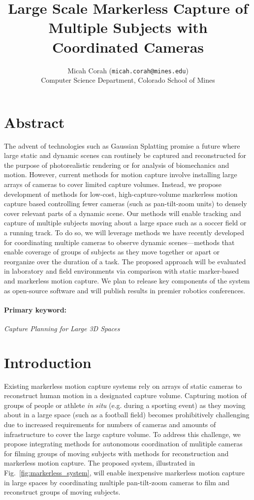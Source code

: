 \documentclass[11pt]{article}
\title{Large Scale Markerless Capture of Multiple Subjects
with Coordinated Cameras}
\author{Micah Corah (\texttt{micah.corah@mines.edu})
  \\
  Computer Science Department,
  Colorado School of Mines
}
\date{}
\begin{document}
\maketitle

\section{Abstract}


The advent of technologies such as Gaussian Splatting promise a future where
large static and dynamic scenes can routinely be captured and reconstructed for
the purpose of photorealistic rendering or for analysis of biomechanics and
motion.
However, current methods for motion capture involve installing large
arrays of cameras to cover limited capture volumes.
Instead, we propose development of methods for low-cost, high-capture-volume
markerless motion capture based controlling fewer cameras
(such as pan-tilt-zoom units) to densely cover relevant parts of a dynamic
scene.
Our methods will enable tracking and capture of multiple subjects moving about a
large space such as a soccer field or a running track.
To do so, we will leverage methods we have recently developed for coordinating
multiple cameras to observe dynamic scenes---methods that enable coverage of
groups of subjects as they move together or apart or reorganize over the
duration of a task.
The proposed approach will be evaluated in laboratory and field environments via
comparison with static marker-based and markerless motion capture.
We plan to release key components of the system as open-source software and will
publish results in premier robotics conferences.

\paragraph{Primary keyword:}
\emph{Capture Planning for Large 3D Spaces}

\section{Introduction}

Existing markerless motion capture systems rely on arrays of static cameras
to reconstruct human motion in a designated capture volume.
Capturing motion of groups of people or athlete \emph{in situ} (e.g. during a
sporting event) as they moving about in a large space (such as a football field)
becomes prohibitively challenging due to increased requirements for numbers of
cameras and amounts of infrastructure to cover the large capture volume.
To address this challenge, we propose integrating methods for autonomous
coordination of mulitiple cameras for filming groups of moving subjects with
methods for reconstruction and markerless motion capture.
The proposed system, illustrated in Fig.~\ref{fig:markerless_system}, will
enable inexpensive markerless motion capture in large spaces
by coordinating multiple pan-tilt-zoom cameras to film and reconstruct
groups of moving subjects.
\end{document}
